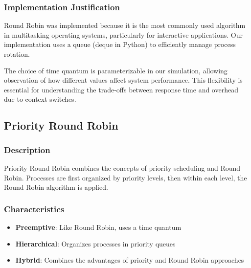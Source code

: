 \documentclass[12pt,a4paper]{article}
\begin{document}
\subsubsection{Implementation Justification}
Round Robin was implemented because it is the most commonly used algorithm in multitasking operating systems, particularly for interactive applications. Our implementation uses a queue (deque in Python) to efficiently manage process rotation.

The choice of time quantum is parameterizable in our simulation, allowing observation of how different values affect system performance. This flexibility is essential for understanding the trade-offs between response time and overhead due to context switches.

\subsection{Priority Round Robin}
\subsubsection{Description}
Priority Round Robin combines the concepts of priority scheduling and Round Robin. Processes are first organized by priority levels, then within each level, the Round Robin algorithm is applied.

\subsubsection{Characteristics}
\begin{itemize}
    \item \textbf{Preemptive}: Like Round Robin, uses a time quantum
    \item \textbf{Hierarchical}: Organizes processes in priority queues
    \item \textbf{Hybrid}: Combines the advantages of priority and Round Robin approaches
\end{itemize}
\end{document}
